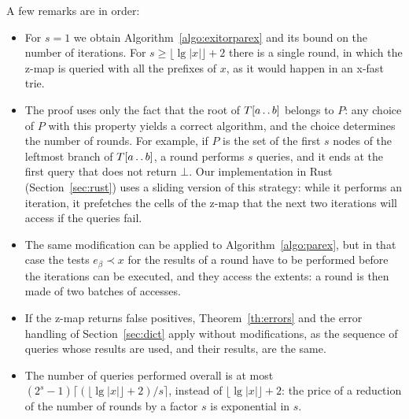 \documentclass[a4paper]{article}
\newcommand{\?}{\mskip1.5mu}
\def\..{\,\mathpunct{\ldotp\ldotp}} %
\begin{document}
A few remarks are in order:
\begin{itemize}
\item For $s=1$ we obtain Algorithm~\ref{algo:exitorparex} and its bound on the number of iterations. For $s\geq\lfloor\lg|x|\rfloor+2$ there is a single round, 
in which the z-map is queried with all the prefixes of $x$, as it would happen in an x-fast trie.
\item The proof uses only the fact that the root of $T[a\..b]$ belongs to $P$: any choice of $P$ with this property yields a correct 
algorithm, and the choice determines the number of rounds. For example, if $P$ is the set of the first $s$ nodes of the leftmost branch of $T[a\..b]$, 
a round performs $s$ queries, and it ends at the first query that does not return $\bot$. Our implementation in Rust (Section~\ref{sec:rust}) 
uses a sliding version of this strategy: while it performs an iteration, it prefetches the cells of the z-map that the next two iterations 
will access if the queries fail. 
\item The same modification can be applied to Algorithm~\ref{algo:parex}, but in that case the tests $e_\beta\prec x$ for the results of a round
have to be performed before the iterations can be executed, and they access the extents: a round is then made of two batches of accesses.
\item If the z-map returns false positives, Theorem~\ref{th:errors} and the error handling of Section~\ref{sec:dict} apply without modifications, 
as the sequence of queries whose results are used, and their results, are the same.
\item The number of queries performed overall is at most $(2^s-1)\bigl\lceil(\lfloor\lg|x|\rfloor+2)/s\bigr\rceil$, instead of $\lfloor\lg|x|\rfloor+2$: 
the price of a reduction of the number of rounds by a factor $s$ is exponential in $s$.
\end{itemize}
\end{document}
